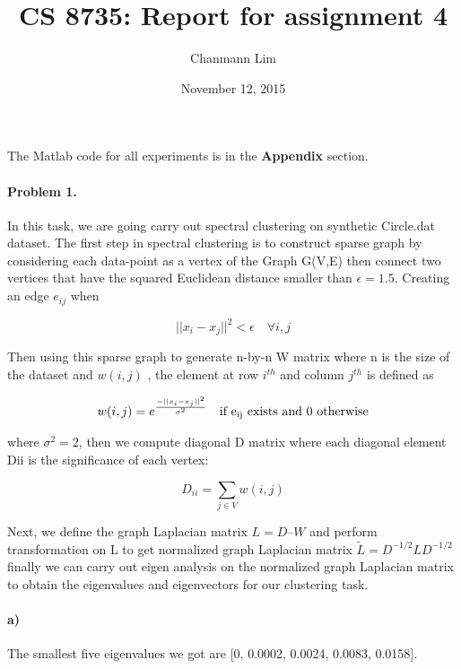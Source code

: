 \documentclass[a4paper]{article}
\begin{document}
\title{CS 8735: Report for assignment 4}
\author{Chanmann Lim}
\date{November 12, 2015}
\maketitle

\noindent The Matlab code for all experiments is in the \textbf{Appendix} section.

\paragraph{Problem 1.} In this task, we are going carry out spectral clustering on synthetic Circle.dat dataset. The first step in spectral clustering is to construct sparse graph by considering each data-point as a vertex of the Graph G(V,E) then connect two vertices that have the squared Euclidean distance smaller than $\epsilon = 1.5$. Creating an edge $e_{ij}$ when

\begin{equation}
	||x_i-x_j||^2 < \epsilon  \quad     \forall i,j
\end{equation}

Then using this sparse graph to generate n-by-n W matrix where n is the size of the dataset and $w(i, j)$ , the element at row $i^{th}$ and column $j^{th}$ is defined as

\begin{equation}
	w(i, j) = e^{\frac{-||x_i-x_j||^2}{\sigma^2}} \quad \text{if e\textsubscript{ij} exists and 0 otherwise}
\end{equation}

where $\sigma^2=2$, then we compute diagonal D matrix where each diagonal element Dii is the significance of each vertex:

\begin{equation}
	D_{ii}= \sum_{j\in V} w(i,j)
\end{equation}

Next, we define the graph Laplacian matrix $L = D – W$ and perform transformation on L to get normalized graph Laplacian matrix $\tilde{L}=D^{-1/2} LD^{-1/2}$ finally we can carry out eigen analysis on the normalized graph Laplacian matrix to obtain the eigenvalues and eigenvectors for our clustering task.

\paragraph{a)} The smallest five eigenvalues we got are [0, 0.0002, 0.0024, 0.0083, 0.0158].
\end{document}

